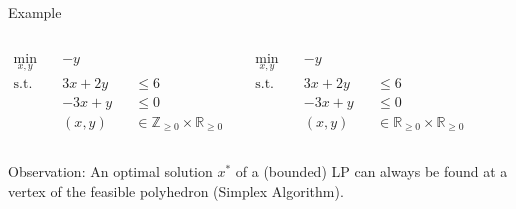 \begin{frame}{Example}
\begin{columns}
	\begin{tcolorbox}[colback=white]
    \begin{align*}
    	\min_{x,y}\quad & -y \\
    	\text{s.t.}\quad & 3x + 2y &&\leq 6 \\
    	& -3x + y &&\leq 0 \\
    	& (x, y) &&\in \mathbb{Z}_{\geq 0} \times \mathbb{R}_{\geq 0}
    \end{align*}
	\end{tcolorbox}

	\begin{tcolorbox}[colback=white]
    \begin{align*}
    	\min_{x,y}\quad & -y \\
    	\text{s.t.}\quad & 3x + 2y &&\leq 6 \\
    	& -3x + y &&\leq 0 \\
    	& (x, y) &&\in \mathbb{R}_{\geq 0} \times \mathbb{R}_{\geq 0}
    \end{align*}
	\end{tcolorbox}
    
    \end{columns}
    
    Observation: An optimal solution $x^*$ of a (bounded) LP can always be found at a vertex of the feasible polyhedron (Simplex Algorithm).
\end{frame}